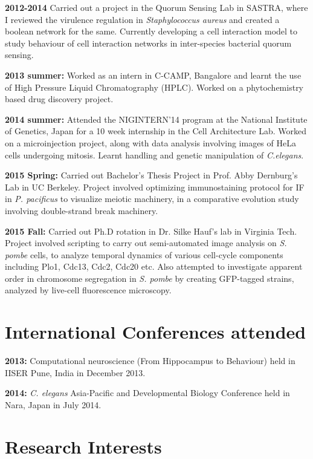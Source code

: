 \documentclass{res}
\begin{document}
\begin{resume}
{\bf 2012-2014} Carried out a project in the Quorum Sensing Lab in SASTRA, where I reviewed the virulence regulation in {\it Staphylococcus aureus} and created a boolean network for the same. Currently developing a cell interaction model to study behaviour of cell interaction networks in inter-species bacterial quorum sensing.

{\bf 2013 summer:} Worked as an intern in C-CAMP, Bangalore and learnt the use of High Pressure Liquid Chromatography (HPLC). Worked on a phytochemistry based drug discovery project.

{\bf 2014 summer:} Attended the NIGINTERN'14 program at the National Institute of Genetics, Japan for a 10 week internship in the Cell Architecture Lab. Worked on a microinjection project, along with data analysis involving images of HeLa cells undergoing mitosis. Learnt handling and genetic manipulation of {\it C.elegans}. 

{\bf 2015 Spring:} Carried out Bachelor's Thesis Project in Prof. Abby Dernburg's Lab in UC Berkeley. Project involved optimizing immunostaining protocol for IF in {\it P. pacificus} to visualize meiotic machinery, in a comparative evolution study involving double-strand break machinery. 

{\bf 2015 Fall:} Carried out Ph.D rotation in Dr. Silke Hauf's lab in Virginia Tech. Project involved scripting to carry out semi-automated image analysis on {\it S. pombe} cells, to analyze temporal dynamics of various cell-cycle components including Plo1, Cdc13, Cdc2, Cdc20 etc. Also attempted to investigate apparent order in chromosome segregation in {\it S. pombe} by creating GFP-tagged strains, analyzed by live-cell fluorescence microscopy. 

\section{International Conferences attended}
\vspace{0.1in}

{\bf 2013:} Computational neuroscience (From Hippocampus to Behaviour) held in IISER Pune, India in December 2013.

{\bf 2014:} {\it C. elegans} Asia-Pacific and Developmental Biology Conference held in Nara, Japan in July 2014.   

\section{Research Interests}
\vspace{0.1in}


\end{resume}
\end{document}
